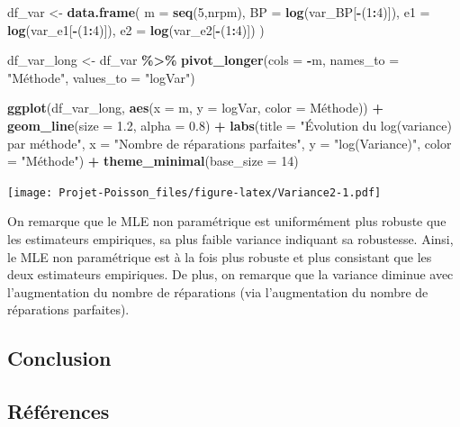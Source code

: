 \documentclass[
]{article}
\newenvironment{Shaded}{\begin{snugshade}}{\end{snugshade}}
\newcommand{\AttributeTok}[1]{\textcolor[rgb]{0.13,0.29,0.53}{#1}}
\newcommand{\DecValTok}[1]{\textcolor[rgb]{0.00,0.00,0.81}{#1}}
\newcommand{\FloatTok}[1]{\textcolor[rgb]{0.00,0.00,0.81}{#1}}
\newcommand{\FunctionTok}[1]{\textcolor[rgb]{0.13,0.29,0.53}{\textbf{#1}}}
\newcommand{\NormalTok}[1]{#1}
\newcommand{\OtherTok}[1]{\textcolor[rgb]{0.56,0.35,0.01}{#1}}
\newcommand{\SpecialCharTok}[1]{\textcolor[rgb]{0.81,0.36,0.00}{\textbf{#1}}}
\newcommand{\StringTok}[1]{\textcolor[rgb]{0.31,0.60,0.02}{#1}}
\begin{document}
\begin{Shaded}
\begin{Highlighting}[]
\NormalTok{df\_var }\OtherTok{\textless{}{-}} \FunctionTok{data.frame}\NormalTok{(}
  \AttributeTok{m =}  \FunctionTok{seq}\NormalTok{(}\DecValTok{5}\NormalTok{,nrpm),}
  \AttributeTok{BP =} \FunctionTok{log}\NormalTok{(var\_BP[}\SpecialCharTok{{-}}\NormalTok{(}\DecValTok{1}\SpecialCharTok{:}\DecValTok{4}\NormalTok{)]),}
  \AttributeTok{e1 =} \FunctionTok{log}\NormalTok{(var\_e1[}\SpecialCharTok{{-}}\NormalTok{(}\DecValTok{1}\SpecialCharTok{:}\DecValTok{4}\NormalTok{)]),}
  \AttributeTok{e2 =} \FunctionTok{log}\NormalTok{(var\_e2[}\SpecialCharTok{{-}}\NormalTok{(}\DecValTok{1}\SpecialCharTok{:}\DecValTok{4}\NormalTok{)])}
\NormalTok{)}

\NormalTok{df\_var\_long }\OtherTok{\textless{}{-}}\NormalTok{ df\_var }\SpecialCharTok{\%\textgreater{}\%}
  \FunctionTok{pivot\_longer}\NormalTok{(}\AttributeTok{cols =} \SpecialCharTok{{-}}\NormalTok{m, }\AttributeTok{names\_to =} \StringTok{"Méthode"}\NormalTok{, }\AttributeTok{values\_to =} \StringTok{"logVar"}\NormalTok{)}

\FunctionTok{ggplot}\NormalTok{(df\_var\_long, }\FunctionTok{aes}\NormalTok{(}\AttributeTok{x =}\NormalTok{ m, }\AttributeTok{y =}\NormalTok{ logVar, }\AttributeTok{color =}\NormalTok{ Méthode)) }\SpecialCharTok{+}
  \FunctionTok{geom\_line}\NormalTok{(}\AttributeTok{size =} \FloatTok{1.2}\NormalTok{, }\AttributeTok{alpha =} \FloatTok{0.8}\NormalTok{) }\SpecialCharTok{+}
  \FunctionTok{labs}\NormalTok{(}\AttributeTok{title =} \StringTok{"Évolution du log(variance) par méthode"}\NormalTok{,}
       \AttributeTok{x =} \StringTok{"Nombre de réparations parfaites"}\NormalTok{,}
       \AttributeTok{y =} \StringTok{"log(Variance)"}\NormalTok{,}
       \AttributeTok{color =} \StringTok{"Méthode"}\NormalTok{) }\SpecialCharTok{+}
  \FunctionTok{theme\_minimal}\NormalTok{(}\AttributeTok{base\_size =} \DecValTok{14}\NormalTok{)}
\end{Highlighting}
\end{Shaded}

\texttt{[image: Projet-Poisson\_files/figure-latex/Variance2-1.pdf]}

On remarque que le MLE non paramétrique est uniformément plus robuste
que les estimateurs empiriques, sa plus faible variance indiquant sa
robustesse. Ainsi, le MLE non paramétrique est à la fois plus robuste et
plus consistant que les deux estimateurs empiriques. De plus, on
remarque que la variance diminue avec l'augmentation du nombre de
réparations (via l'augmentation du nombre de réparations parfaites).

\subsection{Conclusion}\label{conclusion}

\subsection{Références}\label{ruxe9fuxe9rences}

\printbibliography
\end{document}
